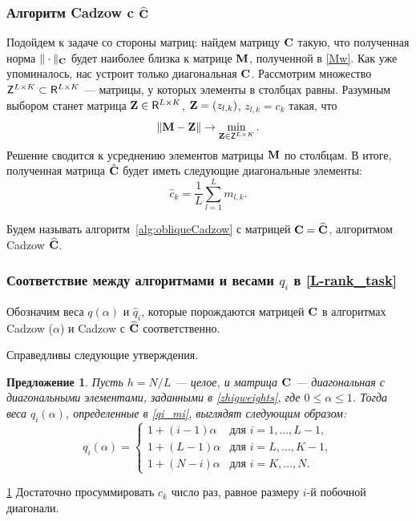 \documentclass[12pt,a4paper,fleqn,leqno]{article}
\newtheorem{proposition}{Предложение}
\begin{document}
\subsubsection{Алгоритм Cadzow c $\widehat{\mathbf{C}}$}
\label{sec:cadzow_hat}
Подойдем к задаче со стороны матриц: найдем матрицу $\mathbf{C}$ такую, что полученная норма $\|\cdot\|_{\mathbf{C}}$ будет наиболее близка к матрице $\mathbf{M}$, полученной в \eqref{Mw}. Как уже упоминалось,
нас устроит только диагональная $\mathbf{C}$. Рассмотрим множество $\mathsf{Z}^{L \times K} \subset \mathsf{R}^{L \times K}$ --- матрицы, у которых элементы в столбцах равны. Разумным выбором станет матрица $\mathbf{Z} \in \mathsf{R}^{L \times K}$, $\mathbf{Z}=(z_{l,k})$, $z_{l,k} = c_k$ такая, что
\begin{equation*}
\|\mathbf{M} - \mathbf{Z}\| \to \min_{\mathbf{Z} \in \mathsf{Z}^{L \times K}}.
\end{equation*}
Решение сводится к усреднению элементов матрицы $\mathbf{M}$ по столбцам. В итоге, полученная матрица $\hat {\mathbf{C}}$ будет иметь следующие диагональные элементы:
\begin{equation}\label{my_s}
\hat c_k = \frac{1}{L}\sum_{l=1}^L m_{l, k}.
\end{equation}

Будем называть алгоритм~\ref{alg:obliqueCadzow} с матрицей $\mathbf{C}=\widehat{\mathbf{C}}$, алгоритмом Cadzow $\widehat{\mathbf{C}}$.

\subsubsection{Соответствие между алгоритмами и весами $q_i$ в \eqref{L-rank_task}}

Обозначим веса $q(\alpha)$ и $\hat q_i$, которые порождаются матрицей $\mathbf{C}$ в алгоритмах Cadzow ($\alpha$) и Cadzow с $\widehat{\mathbf{C}}$ соответственно.

Справедливы следующие утверждения.

\begin{proposition}\label{zhigconseq}
Пусть $h = N/L$ --- целое, и матрица $\mathbf{C}$ --- диагональная с диагональными элементами,
заданными в \eqref{zhigweights},
где $0 \le \alpha \le 1$. Тогда веса $q_i(\alpha)$, определенные в \eqref{qi_mi}, выглядят следующим образом:
\begin{equation*}
q_i (\alpha) = \begin{cases}
1 + (i - 1) \alpha & \text{для $i = 1, \ldots, L-1,$}\\
1 + (L - 1) \alpha & \text{для $i = L, \ldots, K-1,$}\\
1 + (N - i) \alpha & \text{для $i = K, \ldots, N.$}
\end{cases}
\end{equation*}
\end{proposition}
\begin{proof5}{\ref{zhigconseq}}
Достаточно просуммировать $c_k$ число раз, равное размеру $i$-й побочной диагонали.
\end{proof5}
\end{document}
